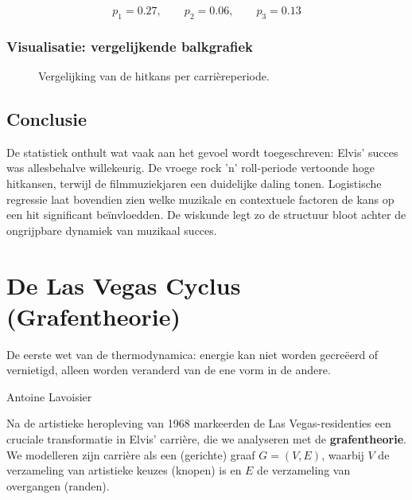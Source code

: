 \documentclass{book}
\begin{document}
	\[
	p_1 = 0.27, \qquad
	p_2 = 0.06, \qquad
	p_3 = 0.13
	\]
	
	\subsection{Visualisatie: vergelijkende balkgrafiek}
	
	\begin{figure}[h!]
		\centering
		\caption{Vergelijking van de hitkans per carri\`ereperiode.}
		\label{fig:hitkans_balk}
	\end{figure}
	
	\section{Conclusie}
	
	De statistiek onthult wat vaak aan het gevoel wordt toegeschreven: Elvis' succes was allesbehalve willekeurig.  
	De vroege rock 'n' roll-periode vertoonde hoge hitkansen, terwijl de filmmuziekjaren een duidelijke daling tonen.  
	Logistische regressie laat bovendien zien welke muzikale en contextuele factoren de kans op een hit significant 
	be\"invloedden. De wiskunde legt zo de structuur bloot achter de ongrijpbare dynamiek van muzikaal succes.
	
	\chapter{De Las Vegas Cyclus (Grafentheorie)}
	\label{chap:grafentheorie}
	
	\epigraph{De eerste wet van de thermodynamica: energie kan niet worden gecre\"eerd of vernietigd, alleen worden veranderd van de ene vorm in de andere.}{Antoine Lavoisier}
	
	Na de artistieke heropleving van 1968 markeerden de Las Vegas-residenties een cruciale transformatie in Elvis' carri\`ere, die we analyseren met de \textbf{grafentheorie}. We modelleren zijn carri\`ere als een (gerichte) graaf $G = (V, E)$, waarbij $V$ de verzameling van artistieke keuzes (knopen) is en $E$ de verzameling van overgangen (randen).
	
\end{document}
